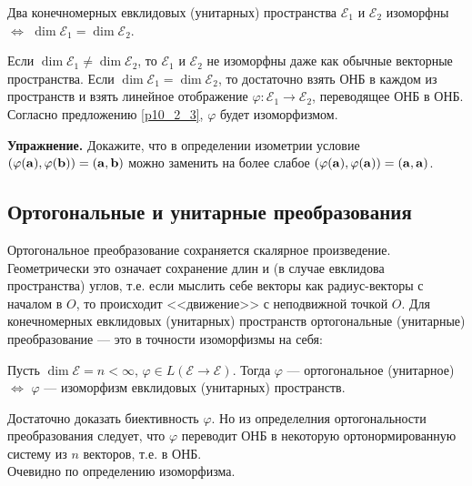 \begin{theor}\label{t10_2_1} 
Два конечномерных евклидовых (унитарных) пространства $\mathcal{E}_1$ и $\mathcal{E}_2$
изоморфны $\Leftrightarrow$ $\dim \mathcal{E}_1 = \dim \mathcal{E}_2$.
\end{theor}
\dok
\dokright 
Если $\dim \mathcal{E}_1 \neq \dim \mathcal{E}_2$, то $\mathcal{E}_1$ и $\mathcal{E}_2$ не изоморфны даже как обычные векторные пространства.
\dokleft
Если $\dim \mathcal{E}_1 = \dim \mathcal{E}_2$, то достаточно взять ОНБ в каждом из пространств и взять линейное отображение $\varphi: \mathcal{E}_1 \to \mathcal{E}_2$, 
переводящее ОНБ в ОНБ. %
Согласно предложению \ref{p10_2_3}, $\varphi$ будет изоморфизмом.
\edok

\otstup

{\bf Упражнение.} Докажите, что в определении изометрии условие 
$(\varphi (\mathbf{a}), \varphi (\mathbf{b}))=(\mathbf{a},\mathbf{b})$
можно заменить на более слабое $(\varphi (\mathbf{a}), \varphi (\mathbf{a}))=(\mathbf{a},\mathbf{a})$.


\subsection{Ортогональные  и унитарные преобразования}



Ортогональное преобразование сохраняется скалярное произведение. Геометрически это означает сохранение длин и (в случае евклидова пространства) углов,
т.е. если мыслить себе векторы как радиус-векторы с началом в $O$, то происходит <<движение>> с неподвижной точкой $O$.
Для конечномерных евклидовых (унитарных) пространств ортогональные (унитарные) преобразование --- это в точности изоморфизмы на себя:

\begin{predl}\label{p10_5_1} 
Пусть $\dim \mathcal{E}=n<\infty $, $\varphi \in L(\mathcal{E}\to \mathcal{E})$. 
Тогда $\varphi$ --- ортогональное (унитарное) $\Leftrightarrow$ $\varphi$ --- изоморфизм евклидовых (унитарных) пространств.
\end{predl}
\dok \dokright Достаточно доказать биективность $\varphi$. Но из определелния ортогональности преобразования следует, что 
$\varphi$ переводит ОНБ в некоторую ортонормированную систему из $n$ векторов, т.е. в ОНБ. %
\\
\dokleft Очевидно по определению изоморфизма.
\edok

